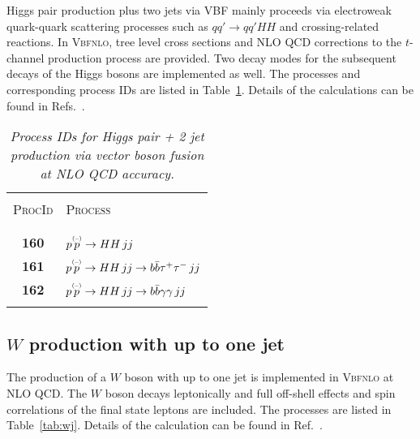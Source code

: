 \documentclass[english,12pt]{article}
\begin{document}
Higgs pair production plus two jets via VBF mainly proceeds via
electroweak quark-quark scattering processes such as $qq'\to qq'HH$ and
crossing-related reactions. In \textsc{Vbfnlo}, tree level cross
sections and NLO QCD corrections to the $t$-channel production process
are provided. Two decay modes for the subsequent decays of the Higgs bosons are 
implemented as well. The processes and corresponding process IDs are listed
in Table~\ref{tab:hhjj}.  Details of the calculations can be found in
Refs.~\cite{Figy:2008zd,Baglio:2012np}.

\begin{table}[htb!]
\newcommand{\lstrut}{{$\strut\atop\strut$}}
\begin{center}
\small
\begin{tabular}{c|l}
\hline
&\\
\textsc{ProcId} & \textsc{Process}\\
&\\
\hline
&\\
\bf 160 & $p \overset{\mbox{\tiny{(--)}}}{p} \to HH \,  jj$ \\
\bf 161 & $p \overset{\mbox{\tiny{(--)}}}{p} \to HH \,  jj \to b\bar{b}\tau^+\tau^- \, jj$ \\
\bf 162 & $p \overset{\mbox{\tiny{(--)}}}{p} \to HH \,  jj \to b\bar{b}\gamma\gamma \, jj$ \\
&\\
\hline
\end{tabular}
\caption {\em  Process IDs for Higgs pair + 2 jet
production via vector boson fusion at NLO QCD accuracy.}
\vspace{0.2cm}
\label{tab:hhjj}
\end{center}
\end{table}




\subsection{$W$ production with up to one jet}
\label{sec:wj}

The production of a $W$ boson with up to one jet is implemented in \textsc{Vbfnlo} at NLO
QCD. 
The $W$ boson decays leptonically and full off-shell effects and spin correlations of the final state leptons are included.
The processes are listed in Table~\ref{tab:wj}.
Details of the calculation can be found in Ref.~\cite{robin}.
\end{document}
